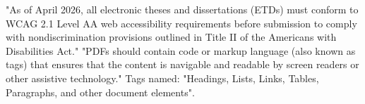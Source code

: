 

%
%
%
%
%
\thesisrequiretagging
\thesisrequiredocumentlanguage
{}
	{"As of April 2026, all electronic theses and dissertations (ETDs) must
	 conform to WCAG 2.1 Level AA web accessibility requirements before
	 submission to comply with nondiscrimination provisions outlined in Title II
	 of the Americans with Disabilities Act."}
	{"PDFs should contain code or markup language (also known as tags) that
	 ensures that the content is navigable and readable by screen readers or
	 other assistive technology." Tags named: "Headings, Lists, Links, Tables,
	 Paragraphs, and other document elements".}
